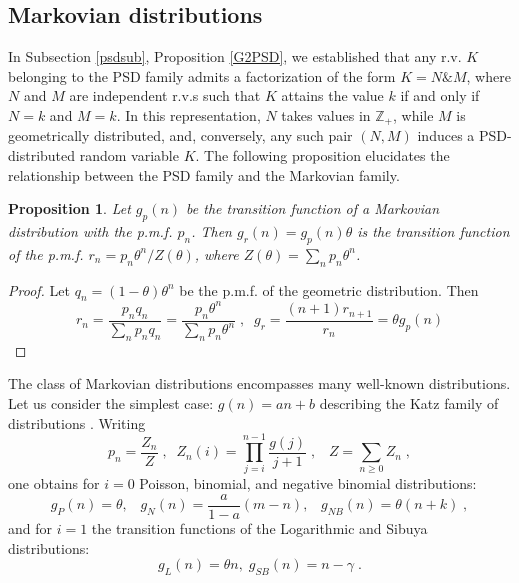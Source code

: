 \documentclass[a4paper,12pt]{amsart}
\newcommand{\Z}{\mathbb{Z}_{+}}
\newtheorem{Proposition}{Proposition}[section]
\theoremstyle{definition}
\theoremstyle{remark}
\begin{document}
\subsection{Markovian distributions} 
In Subsection \ref{psdsub}, Proposition \ref{G2PSD}, we established that any r.v. $K$ belonging to the PSD family admits a factorization of the form $K = N \& M$, where $N$ and $M$ are independent r.v.s such that $K$ attains the value $k$ if and only if $N = k$ and $M = k$. In this representation, $N$ takes values in $\Z$, while $M$ is geometrically distributed, and, conversely, any such pair $(N, M)$ induces a PSD-distributed random variable $K$. The following proposition elucidates the relationship between the PSD family and the Markovian family.
\begin{Proposition}\label{g_PSD}
Let $g_p(n)$ be the transition function of a Markovian distribution with the p.m.f. $p_n$. Then $g_r(n)=g_p(n)\theta$ is the transition function of the p.m.f. $r_n=p_n \theta^n/Z(\theta)$, where $Z(\theta)=\sum_n p_n \theta^n$.
\end{Proposition}
\begin{proof}
Let $q_n=(1-\theta)\theta^n$ be the p.m.f. of the geometric distribution. Then
\[
r_n=\frac{p_n q_n}{\sum_n p_n q_n}=
\frac{p_n\theta^n}{\sum_n p_n \theta^n}\;,\;\;g_r=\frac{(n+1)r_{n+1}}{r_n}
=\theta g_p(n)
\]
\end{proof}
The class of Markovian distributions encompasses many well-known distributions. Let us consider the simplest case: $g(n)=a n + b$ describing the Katz family of distributions \cite{JKK2005}. Writing    
\begin{equation} \label{gndef}
p_n=\frac{Z_n}{Z}\;,\;\; Z_n(i)=\prod_{j=i}^{n-1}\frac{g(j)}{j+1}\;,\;\;\;Z=\sum_{n\geq 0}Z_n\;,
\end{equation}
one obtains for $i=0$  Poisson, binomial, and negative binomial distributions: 
\begin{equation}\label{gnsimp1}
g_P(n)=\theta,\;\;\; g_N(n)=\frac{a}{1-a}(m-n),\;\;\; g_{NB}(n)=\theta (n+k)\;,
\end{equation}
and for $i=1$ the transition functions of the Logarithmic and Sibuya distributions:
\begin{equation}\label{gnsimp2}
g_L(n)=\theta n,\; g_{SB}(n)=n-\gamma\;.
\end{equation}
\end{document}
